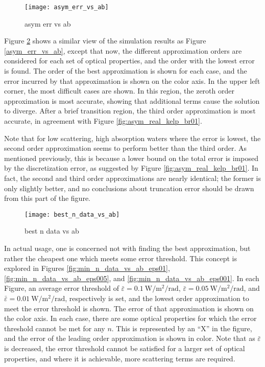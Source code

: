 \begin{figure}[H]
  \centering
  \texttt{[image: asym\_err\_vs\_ab]}
  \caption{asym err vs ab}
  \label{fig:asym_err_vs_ab}
\end{figure}

Figure \ref{fig:best_n_data_vs_ab} shows a similar view of the simulation results as Figure \ref{asym_err_vs_ab}, except that now, the different approximation orders are considered for each set of optical properties, and the order with the lowest error is found.
The order of the best approximation is shown for each case, and the error incurred by that approximation is shown on the color axis.
In the upper left corner, the most difficult cases are shown.
In this region, the zeroth order approximation is most accurate, showing that additional terms cause the solution to diverge.
After a brief transition region, the third order approximation is most accurate, in agreement with Figure \ref{fig:asym_real_kelp_br01}.

Note that for low scattering, high absorption waters where the error is lowest, the second order approximation seems to perform better than the third order.
As mentioned previously, this is because a lower bound on the total error is imposed by the discretization error, as suggested by Figure \ref{fig:asym_real_kelp_br01}.
In fact, the second and third order approximations are nearly identical; the former is only slightly better, and no conclusions about truncation error should be drawn from this part of the figure.

\begin{figure}[H]
  \centering
  \texttt{[image: best\_n\_data\_vs\_ab]}
  \caption{best n data vs ab}
  \label{fig:best_n_data_vs_ab}
\end{figure}

In actual usage, one is concerned not with finding the best approximation, but rather the cheapest one which meets some error threshold.
This concept is explored in Figures \ref{fig:min_n_data_vs_ab_eps01}, \ref{fig:min_n_data_vs_ab_eps005}, and \ref{fig:min_n_data_vs_ab_eps001}.
In each Figure, an average error threshold of $\bar{\varepsilon}=\SI{0.1}{\W\per\m\squared\per\radian}$, $\bar{\varepsilon}=\SI{0.05}{\W\per\m\squared\per\radian}$, and $\bar{\varepsilon}=\SI{0.01}{\W\per\m\squared\per\radian}$, respectively is set, and the lowest order approximation to meet the error threshold is shown.
The error of that approximation is shown on the color axis.
In each case, there are some optical properties for which the error threshold cannot be met for any $n$.
This is represented by an ``X'' in the figure, and the error of the leading order approximation is shown in color.
Note that as $\bar\varepsilon$ is decreased, the error threshold cannot be satisfied for a larger set of optical properties, and where it is achievable, more scattering terms are required.

